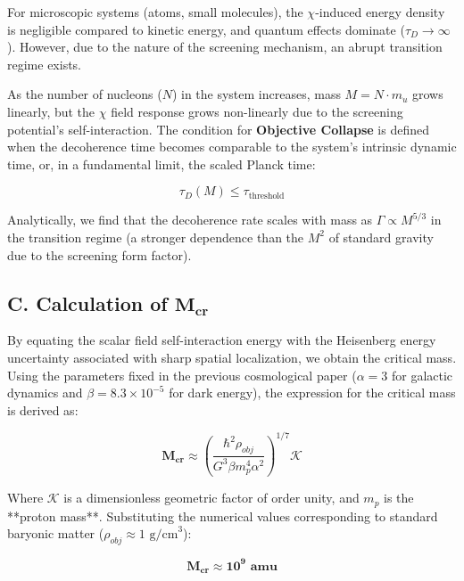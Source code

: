 \documentclass[11pt, a4paper]{article}
\begin{document}
For microscopic systems (atoms, small molecules), the $\chi$-induced energy density is negligible compared to kinetic energy, and quantum effects dominate ($\tau_{D} \to \infty$). However, due to the nature of the screening mechanism, an abrupt transition regime exists.

As the number of nucleons ($N$) in the system increases, mass $M = N \cdot m_u$ grows linearly, but the $\chi$ field response grows non-linearly due to the screening potential's self-interaction.
The condition for \textbf{Objective Collapse} is defined when the decoherence time becomes comparable to the system's intrinsic dynamic time, or, in a fundamental limit, the scaled Planck time:

\begin{equation}
    \tau_{D} (M) \leq \tau_{\text{threshold}}
\end{equation}

Analytically, we find that the decoherence rate scales with mass as $\Gamma \propto M^{5/3}$ in the transition regime (a stronger dependence than the $M^2$ of standard gravity due to the screening form factor).

\subsection{\texorpdfstring{C. Calculation of $\mathbf{M_{cr}}$}{C. Calculation of M_cr}} 

By equating the scalar field self-interaction energy with the Heisenberg energy uncertainty associated with sharp spatial localization, we obtain the critical mass.
Using the parameters fixed in the previous cosmological paper ($\alpha = 3$ for galactic dynamics and $\beta = 8.3 \times 10^{-5}$ for dark energy), the expression for the critical mass is derived as:

\begin{equation}
    \mathbf{M_{cr}} \approx \left( \frac{\hbar^2 \rho_{obj}}{G^3 \beta m_p^4 \alpha^2} \right)^{1/7} \mathcal{K}
\end{equation}

Where $\mathcal{K}$ is a dimensionless geometric factor of order unity, and $m_p$ is the **proton mass**. Substituting the numerical values corresponding to standard baryonic matter ($\rho_{obj} \approx 1 \text{ g/cm}^3$):

\begin{equation}
    \mathbf{M_{cr} \approx 10^9 \text{ amu}}
\end{equation}
\end{document}
